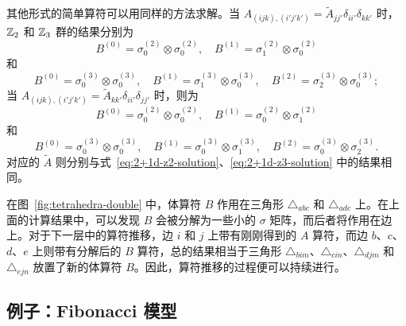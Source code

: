 其他形式的简单算符可以用同样的方法求解。当 $A_{(ijk),(i'j'k')}=\tilde{A}_{jj'}\delta_{ii'}\delta_{kk'}$ 时，$\mathbb{Z}_2$ 和 $\mathbb{Z}_3$ 群的结果分别为
\begin{equation}
  B^{(0)} = \sigma^{(2)}_0 \otimes \sigma^{(2)}_0, \quad
  B^{(1)} = \sigma^{(2)}_1 \otimes \sigma^{(2)}_0
\end{equation}
和
\begin{equation}
  B^{(0)} = \sigma^{(3)}_0 \otimes \sigma^{(3)}_0, \quad
  B^{(1)} = \sigma^{(3)}_1 \otimes \sigma^{(3)}_0, \quad
  B^{(2)} = \sigma^{(3)}_2 \otimes \sigma^{(3)}_0;
\end{equation}
当 $A_{(ijk),(i'j'k')}=\tilde{A}_{kk'}\delta_{ii'}\delta_{jj'}$ 时，则为
\begin{equation}
  B^{(0)} = \sigma^{(2)}_0 \otimes \sigma^{(2)}_0, \quad
  B^{(1)} = \sigma^{(2)}_0 \otimes \sigma^{(2)}_1
\end{equation}
和
\begin{equation}
  B^{(0)} = \sigma^{(3)}_0 \otimes \sigma^{(3)}_0, \quad
  B^{(1)} = \sigma^{(3)}_0 \otimes \sigma^{(3)}_1, \quad
  B^{(2)} = \sigma^{(3)}_0 \otimes \sigma^{(3)}_2.
\end{equation}
对应的 $\tilde{A}$ 则分别与式~\eqref{eq:2+1d-z2-solution}、\eqref{eq:2+1d-z3-solution} 中的结果相同。

在图~\ref{fig:tetrahedra-double} 中，体算符 $B$ 作用在三角形 $\triangle_{abc}$ 和 $\triangle_{ade}$ 上。在上面的计算结果中，可以发现 $B$ 会被分解为一些小的 $\sigma$ 矩阵，而后者将作用在边上。对于下一层中的算符推移，边 $i$ 和 $j$ 上带有刚刚得到的 $A$ 算符，而边 $b$、$c$、$d$、$e$ 上则带有分解后的 $B$ 算符，总的结果相当于三角形 $\triangle_{bim}$、$\triangle_{cin}$、$\triangle_{djm}$ 和 $\triangle_{ejn}$ 放置了新的体算符 $B$。因此，算符推移的过程便可以持续进行。

\subsection{例子：Fibonacci 模型}

